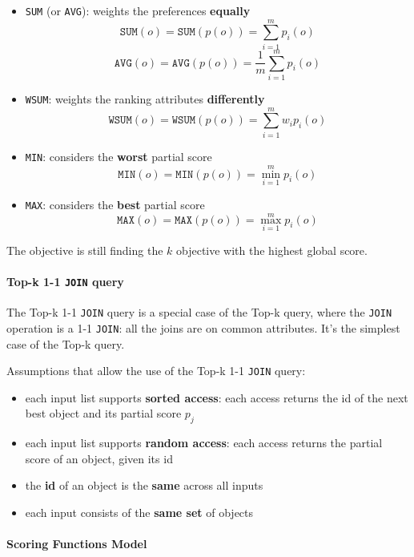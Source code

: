\documentclass[english]{article}
\begin{document}
\begin{itemize}
  \item \texttt{SUM} (or \texttt{AVG}): weights the preferences \textbf{equally}
        \[ \texttt{SUM}(o) = \texttt{SUM}\left( p(o) \right) = \displaystyle\sum_{i=1}^m p_i(o) \]
        \[ \texttt{AVG}(o) = \texttt{AVG}\left( p(o) \right) = \frac{1}{m} \displaystyle\sum_{i=1}^m p_i(o) \]
  \item \texttt{WSUM}: weights the ranking attributes \textbf{differently}
        \[ \texttt{WSUM}(o) = \texttt{WSUM}\left( p(o) \right) = \displaystyle\sum_{i=1}^m w_i p_i(o) \]
  \item \texttt{MIN}: considers the \textbf{worst} partial score
        \[ \texttt{MIN}(o) = \texttt{MIN}\left( p(o) \right) = \min_{i=1}^m p_i(o) \]
  \item \texttt{MAX}: considers the \textbf{best} partial score
        \[ \texttt{MAX}(o) = \texttt{MAX}\left( p(o) \right) = \max_{i=1}^m p_i(o) \]
\end{itemize}

The objective is still finding the \(k\) objective with the highest global score.

\paragraph{Top-k 1-1 \texttt{JOIN} query}

The Top-k 1-1 \texttt{JOIN} query is a special case of the Top-k query, where the \texttt{JOIN} operation is a 1-1 \texttt{JOIN}:
all the joins are on common attributes.
It's the simplest case of the Top-k query.

Assumptions that allow the use of the \sql Top-k 1-1 \texttt{JOIN} query:

\begin{itemize}
  \item each input list supports \textbf{sorted access}: each access returns the id of the next best object and its partial score \(p_j\)
  \item each input list supports \textbf{random access}: each access returns the partial score of an object, given its id
  \item the \textbf{id} of an object is the \textbf{same} across all inputs
  \item each input consists of the \textbf{same set} of objects
\end{itemize}

\paragraph{Scoring Functions Model}
\end{document}
